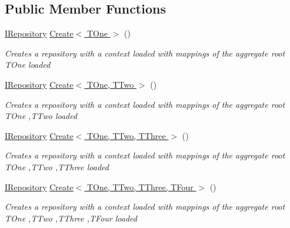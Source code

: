 \subsection*{Public Member Functions}
\begin{DoxyCompactItemize}
\item 
\hyperlink{interface_highway_1_1_data_1_1_interfaces_1_1_i_repository}{I\-Repository} \hyperlink{interface_highway_1_1_data_1_1_interfaces_1_1_i_repository_factory_a343d7436f44181174c5a213ae59f4588}{Create$<$ T\-One $>$} ()
\begin{DoxyCompactList}\small\item\em Creates a repository with a context loaded with mappings of the aggregate root {\itshape T\-One}  loaded \end{DoxyCompactList}\item 
\hyperlink{interface_highway_1_1_data_1_1_interfaces_1_1_i_repository}{I\-Repository} \hyperlink{interface_highway_1_1_data_1_1_interfaces_1_1_i_repository_factory_af84ae4a3ffcb355f70c9ab332b27fa75}{Create$<$ T\-One, T\-Two $>$} ()
\begin{DoxyCompactList}\small\item\em Creates a repository with a context loaded with mappings of the aggregate root {\itshape T\-One} ,{\itshape T\-Two}  loaded \end{DoxyCompactList}\item 
\hyperlink{interface_highway_1_1_data_1_1_interfaces_1_1_i_repository}{I\-Repository} \hyperlink{interface_highway_1_1_data_1_1_interfaces_1_1_i_repository_factory_a52f84ef3732b1f34558d928e02f0f7c4}{Create$<$ T\-One, T\-Two, T\-Three $>$} ()
\begin{DoxyCompactList}\small\item\em Creates a repository with a context loaded with mappings of the aggregate root {\itshape T\-One} ,{\itshape T\-Two} ,{\itshape T\-Three}  loaded \end{DoxyCompactList}\item 
\hyperlink{interface_highway_1_1_data_1_1_interfaces_1_1_i_repository}{I\-Repository} \hyperlink{interface_highway_1_1_data_1_1_interfaces_1_1_i_repository_factory_a41cfb8f0c6ee57071f92df68c7f5a7b9}{Create$<$ T\-One, T\-Two, T\-Three, T\-Four $>$} ()
\begin{DoxyCompactList}\small\item\em Creates a repository with a context loaded with mappings of the aggregate root {\itshape T\-One} ,{\itshape T\-Two} ,{\itshape T\-Three} ,{\itshape T\-Four}  loaded \end{DoxyCompactList}\end{DoxyCompactItemize}


